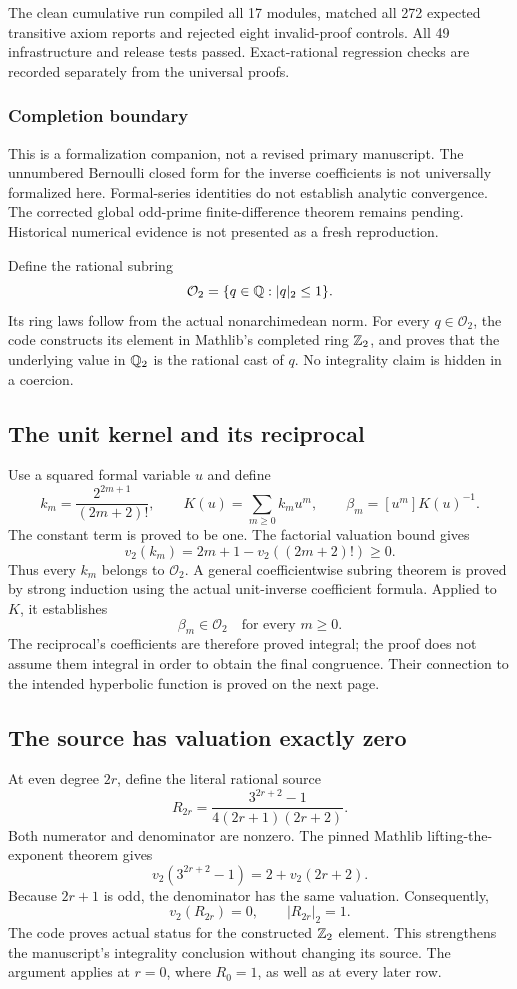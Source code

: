 The clean cumulative run compiled all 17 modules, matched all 272 expected transitive axiom reports and rejected eight invalid-proof controls. All 49 infrastructure and release tests passed. Exact-rational regression checks are recorded separately from the universal proofs.

\subsubsection*{Completion boundary}
This is a formalization companion, not a revised primary manuscript. The unnumbered Bernoulli closed form for the inverse coefficients is not universally formalized here. Formal-series identities do not establish analytic convergence. The corrected global odd-prime finite-difference theorem remains pending. Historical numerical evidence is not presented as a fresh reproduction.
\par\medskip
{}
Define the rational subring
\[
 \mathcal O_2=\{q\in\mathbb Q:|q|_2\leq1\}.
\]
Its ring laws follow from the actual nonarchimedean norm. For every $q\in\mathcal O_2$, the code constructs its element in Mathlib's completed ring $\mathbb Z_2$, and proves that the underlying value in $\mathbb Q_2$ is the rational cast of $q$. No integrality claim is hidden in a coercion.

\subsection*{The unit kernel and its reciprocal}
Use a squared formal variable $u$ and define
\[
 k_m=\frac{2^{2m+1}}{(2m+2)!},\qquad
 K(u)=\sum_{m\geq0}k_mu^m,\qquad
 \beta_m=[u^m]K(u)^{-1}.
\]
The constant term is proved to be one. The factorial valuation bound gives
\[
 v_2(k_m)=2m+1-v_2((2m+2)!)\geq0.
\]
Thus every $k_m$ belongs to $\mathcal O_2$. A general coefficientwise subring theorem is proved by strong induction using the actual unit-inverse coefficient formula. Applied to $K$, it establishes
\[
 \boxed{\beta_m\in\mathcal O_2\quad\text{for every }m\geq0.}
\]
The reciprocal's coefficients are therefore proved integral; the proof does not assume them integral in order to obtain the final congruence. Their connection to the intended hyperbolic function is proved on the next page.

\subsection*{The source has valuation exactly zero}
At even degree $2r$, define the literal rational source
\[
 R_{2r}=\frac{3^{2r+2}-1}{4(2r+1)(2r+2)}.
\]
Both numerator and denominator are nonzero. The pinned Mathlib lifting-the-exponent theorem gives
\[
 v_2(3^{2r+2}-1)=2+v_2(2r+2).
\]
Because $2r+1$ is odd, the denominator has the same valuation. Consequently,
\[
 \boxed{v_2(R_{2r})=0,\qquad |R_{2r}|_2=1.}
\]
The code proves actual  status for the constructed $\mathbb Z_2$ element. This strengthens the manuscript's integrality conclusion without changing its source. The argument applies at $r=0$, where $R_0=1$, as well as at every later row.

